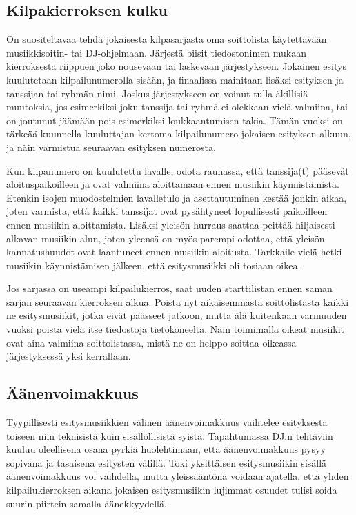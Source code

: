 \documentclass[12pt, a4paper, oneside]{article}
\begin{document}
\subsection{Kilpakierroksen kulku}

On suositeltavaa tehdä jokaisesta kilpasarjasta oma soittolista käytettävään musiikkisoitin- tai DJ-ohjelmaan. Järjestä biisit tiedostonimen mukaan kierroksesta riippuen joko nousevaan tai laskevaan järjestykseen. Jokainen esitys kuulutetaan kilpailunumerolla sisään, ja finaalissa mainitaan lisäksi esityksen ja tanssijan tai ryhmän nimi. Joskus järjestykseen on voinut tulla äkillisiä muutoksia, jos esimerkiksi joku tanssija tai ryhmä ei olekkaan vielä valmiina, tai on joutunut jäämään pois esimerkiksi loukkaantumisen takia. Tämän vuoksi on tärkeää kuunnella kuuluttajan kertoma kilpailunumero jokaisen esityksen alkuun, ja näin varmistua seuraavan esityksen numerosta.

Kun kilpanumero on kuulutettu lavalle, odota rauhassa, että tanssija(t) pääsevät aloituspaikoilleen ja ovat valmiina aloittamaan ennen musiikin käynnistämistä. Etenkin isojen muodostelmien lavalletulo ja asettautuminen kestää jonkin aikaa, joten varmista, että kaikki tanssijat ovat pysähtyneet lopullisesti paikoilleen ennen musiikin aloittamista. Lisäksi yleisön hurraus saattaa peittää hiljaisesti alkavan musiikin alun, joten yleensä on myös parempi odottaa, että yleisön kannatushuudot ovat laantuneet ennen musiikin aloitusta. Tarkkaile vielä hetki musiikin käynnistämisen jälkeen, että esitysmusiikki oli tosiaan oikea.

Jos sarjassa on useampi kilpailukierros, saat uuden starttilistan ennen saman sarjan seuraavan kierroksen alkua. Poista nyt aikaisemmasta soittolistasta kaikki ne esitysmusiikit, jotka eivät päässeet jatkoon, mutta älä kuitenkaan varmuuden vuoksi poista vielä itse tiedostoja tietokoneelta. Näin toimimalla oikeat musiikit ovat aina valmiina soittolistassa, mistä ne on helppo soittaa oikeassa järjestyksessä yksi kerrallaan.

\subsection{Äänenvoimakkuus}

Tyypillisesti esitysmusiikkien välinen äänenvoimakkuus vaihtelee esityksestä toiseen niin teknisistä kuin sisällöllisistä syistä. Tapahtumassa DJ:n tehtäviin kuuluu oleellisena osana pyrkiä huolehtimaan, että äänenvoimakkuus pysyy sopivana ja tasaisena esitysten välillä. Toki yksittäisen esitysmusiikin sisällä äänenvoimakkuus voi vaihdella, mutta yleissääntönä voidaan ajatella, että yhden kilpailukierroksen aikana jokaisen esitysmusiikin lujimmat osuudet tulisi soida suurin piirtein samalla äänekkyydellä.
\end{document}
